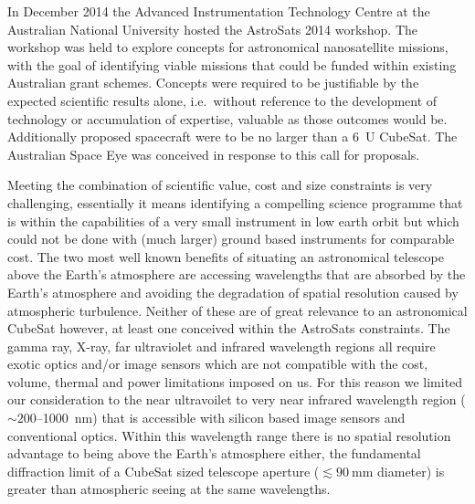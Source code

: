 \documentclass[]{iac}
\begin{document}
In December 2014 the Advanced Instrumentation Technology Centre at the Australian National University hosted the
AstroSats 2014 workshop. The workshop was held to explore concepts for astronomical nanosatellite missions, with the
goal of identifying viable missions that could be funded within existing Australian grant schemes. Concepts were
required to be justifiable by the expected scientific results alone, i.e.\ without reference to the development of
technology or accumulation of expertise, valuable as those outcomes would be. Additionally proposed spacecraft were to
be no larger than a \SI{6}{U} CubeSat. The Australian Space Eye was conceived in response to this call for proposals.

Meeting the combination of scientific value, cost and size constraints is very challenging, essentially it means
identifying a compelling science programme that is within the capabilities of a very small instrument in low earth orbit
but which could not be done with (much larger) ground based instruments for comparable cost.  The two most well known
benefits of situating an astronomical telescope above the Earth's atmosphere are accessing wavelengths that are absorbed
by the Earth's atmosphere and avoiding the degradation of spatial resolution caused by atmospheric turbulence. Neither
of these are of great relevance to an astronomical CubeSat however, at least one conceived within the AstroSats
constraints. The gamma ray, X-ray, far ultraviolet and infrared wavelength regions all require exotic optics and/or
image sensors which are not compatible with the cost, volume, thermal and power limitations imposed on us. For this
reason we limited our consideration to the near ultravoilet to very near infrared wavelength region
($\sim200$--\SI{1000}{\nano\metre}) that is accessible with silicon based image sensors and conventional optics. Within
this wavelength range there is no spatial resolution advantage to being above the Earth's atmosphere either, the
fundamental diffraction limit of a CubeSat sized telescope aperture ($\lesssim\SI{90}{\milli\metre}$ diameter) is
greater than atmospheric seeing at the same wavelengths.
\end{document}
